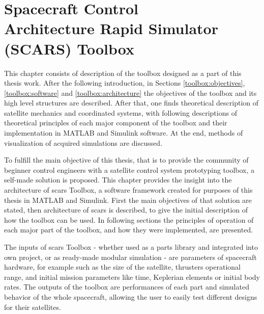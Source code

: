 \section{Spacecraft Control \protect\\Architecture Rapid Simulator \protect\\(SCARS) Toolbox}\label{sec:toolbox}
    This chapter consists of description of the toolbox designed as a part of this thesis work. After the following introduction, in Sections \ref{toolbox:objectives}, \ref{toolbox:software} and \ref{toolbox:architecture} the objectives of the toolbox and its high level structures are described. After that, one finds theoretical description of satellite mechanics and coordinated systems, with following descriptions of theoretical principles of each major component of the toolbox and their implementation in MATLAB and Simulink software. At the end, methods of visualization of acquired simulations are discussed.  

    To fulfill the main objective of this thesis, that is to provide the community of beginner control engineers with a satellite control system prototyping toolbox, a self-made solution is proposed. This chapter provides the insight into the architecture of \ac*{scars} Toolbox, a software framework created for purposes of this thesis in MATLAB and Simulink. First the main objectives of that solution are stated, then architecture of \ac{scars} is described, to give the initial description of how the toolbox can be used. In following sections the principles of operation of each major part of the toolbox, and how they were implemented, are presented.

    The inputs of \ac{scars} Toolbox - whether used as a parts library and integrated into own project, or as ready-made modular simulation - are parameters of spacecraft hardware, for example such as the size of the satellite, thrusters operational range, and initial mission parameters like time, Keplerian elements or initial body rates. The outputs of the toolbox are performances of each part and simulated behavior of the whole spacecraft, allowing the user to easily test different designs for their satellites.

